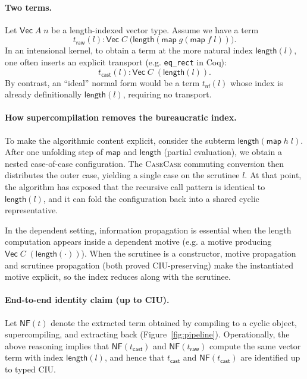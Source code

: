 \paragraph{Two terms.}
Let \(\mathsf{Vec}\;A\;n\) be a length-indexed vector type.
Assume we have a term
\[
  t_{\mathsf{raw}}(l) : \mathsf{Vec}\;C\;\bigl(\mathsf{length}(\mathsf{map}\;g(\mathsf{map}\;f\;l))\bigr).
\]
In an intensional kernel, to obtain a term at the more natural index \(\mathsf{length}(l)\), one often inserts an explicit transport (e.g. \texttt{eq\_rect} in Coq):
\[
  t_{\mathsf{cast}}(l) : \mathsf{Vec}\;C\;(\mathsf{length}(l)).
\]
By contrast, an ``ideal'' normal form would be a term \(t_{\mathsf{nf}}(l)\) whose index is already definitionally \(\mathsf{length}(l)\), requiring no transport.

\paragraph{How supercompilation removes the bureaucratic index.}
To make the algorithmic content explicit, consider the subterm
\(\mathsf{length}(\mathsf{map}\;h\;l)\).
After one unfolding step of \(\mathsf{map}\) and \(\mathsf{length}\) (partial evaluation), we obtain a nested case-of-case configuration.
The \textsc{CaseCase} commuting conversion then distributes the outer case, yielding a single case on the scrutinee \(l\).
At that point, the algorithm has exposed that the recursive call pattern is identical to \(\mathsf{length}(l)\), and it can fold the configuration back into a shared cyclic representative.

In the dependent setting, information propagation is essential when the length computation appears inside a dependent motive (e.g. a motive producing \(\mathsf{Vec}\;C\;(\mathsf{length}(\cdot))\)).
When the scrutinee is a constructor, motive propagation and scrutinee propagation (both proved CIU-preserving) make the instantiated motive explicit, so the index reduces along with the scrutinee.

\paragraph{End-to-end identity claim (up to CIU).}
Let \(\mathsf{NF}(t)\) denote the extracted term obtained by compiling to a cyclic object, supercompiling, and extracting back (Figure~\ref{fig:pipeline}).
Operationally, the above reasoning implies that \(\mathsf{NF}(t_{\mathsf{cast}})\) and \(\mathsf{NF}(t_{\mathsf{raw}})\) compute the same vector term with index \(\mathsf{length}(l)\), and hence that \(t_{\mathsf{cast}}\) and \(\mathsf{NF}(t_{\mathsf{cast}})\) are identified up to typed CIU.

